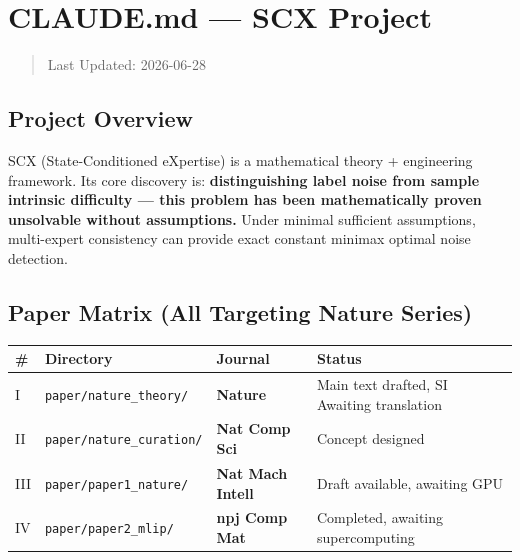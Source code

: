 \documentclass[
  12pt,
]{article}
\author{SCX}
\date{2026}
\begin{document}
\section{CLAUDE.md --- SCX Project}\label{claude.md-scx-project}

\begin{quote}
Last Updated: 2026-06-28
\end{quote}

\subsection{Project Overview}\label{project-overview}

SCX (State-Conditioned eXpertise) is a mathematical theory + engineering framework. Its core discovery is: \textbf{distinguishing label noise from sample intrinsic difficulty --- this problem has been mathematically proven unsolvable without assumptions.} Under minimal sufficient assumptions, multi-expert consistency can provide exact constant minimax optimal noise detection.

\subsection{Paper Matrix (All Targeting Nature Series)}\label{paper-matrix}

\begin{longtable}[]{@{} 
  >{\centering\arraybackslash}p{}
  >{\raggedright\arraybackslash}p{}
  >{\raggedright\arraybackslash}p{}
  >{\centering\arraybackslash}p{}@{}}
\toprule\noalign{}
\begin{minipage}[b]{\linewidth}\centering
\#
\end{minipage} & \begin{minipage}[b]{\linewidth}\raggedright
Directory
\end{minipage} & \begin{minipage}[b]{\linewidth}\raggedright
Journal
\end{minipage} & \begin{minipage}[b]{\linewidth}\centering
Status
\end{minipage} \\
\midrule\noalign{}
\endhead
\bottomrule\noalign{}
\endlastfoot
I & \texttt{paper/nature\_theory/} & \textbf{Nature} & Main text drafted, SI
Awaiting translation \\
II & \texttt{paper/nature\_curation/} & \textbf{Nat Comp Sci} &
Concept designed \\
III & \texttt{paper/paper1\_nature/} & \textbf{Nat Mach Intell} &
Draft available, awaiting GPU \\
IV & \texttt{paper/paper2\_mlip/} & \textbf{npj Comp Mat} & Completed,
awaiting supercomputing \\
\end{longtable}
\end{document}
